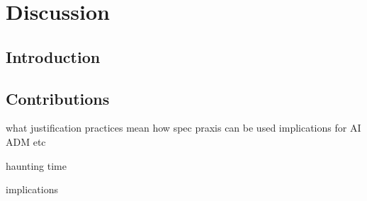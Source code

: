 \chapter{Discussion}
\label{}

\section{Introduction}
\label{sec:}






\section{Contributions}

what justification practices mean 
how spec praxis can be used
implications for AI ADM etc

haunting 
time




implications


